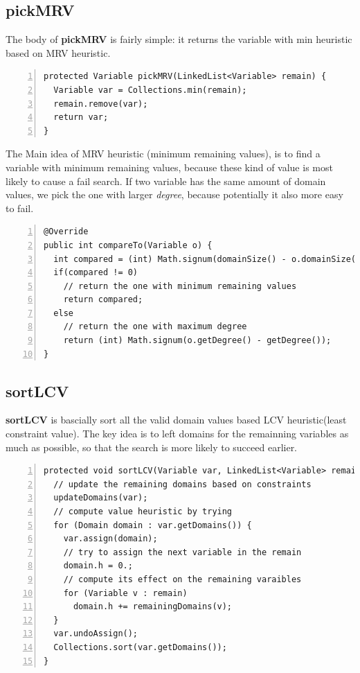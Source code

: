 \documentclass{article}
\begin{document}
\clearpage
\subsection{pickMRV}

The body of \textbf{pickMRV} is fairly simple: it returns the variable with min heuristic based on MRV heuristic.

\begin{lstlisting}[numbers=left]   
protected Variable pickMRV(LinkedList<Variable> remain) {
  Variable var = Collections.min(remain);
  remain.remove(var);
  return var;
}
\end{lstlisting}

The Main idea of MRV heuristic (minimum remaining values), is to find a variable with minimum remaining values, because these kind of value is most likely to cause a fail search. If two variable has the same amount of domain values, we pick the one with larger \emph{degree}, because potentially it also more easy to fail.

\begin{lstlisting}[numbers=left]    
@Override
public int compareTo(Variable o) {
  int compared = (int) Math.signum(domainSize() - o.domainSize());
  if(compared != 0)
    // return the one with minimum remaining values
    return compared;
  else
    // return the one with maximum degree
    return (int) Math.signum(o.getDegree() - getDegree());
}
\end{lstlisting}

\subsection{sortLCV}

\textbf{sortLCV} is bascially sort all the valid domain values based LCV heuristic(least constraint value). The key idea is to left domains for the remainning variables as much as possible, so that the search is more likely to succeed earlier.

\begin{lstlisting}[numbers=left]   
protected void sortLCV(Variable var, LinkedList<Variable> remain) {
  // update the remaining domains based on constraints
  updateDomains(var);
  // compute value heuristic by trying
  for (Domain domain : var.getDomains()) {
    var.assign(domain);
    // try to assign the next variable in the remain
    domain.h = 0.;
    // compute its effect on the remaining varaibles
    for (Variable v : remain)
      domain.h += remainingDomains(v);
  }
  var.undoAssign();
  Collections.sort(var.getDomains());
}
\end{lstlisting}
\end{document}

